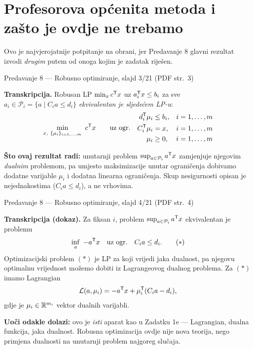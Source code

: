 \section{Profesorova općenita metoda i zašto je ovdje ne trebamo}
\label{sec:z2-dualna-metoda}

Ovo je najvjerojatnije potpitanje na obrani, jer Predavanje 8 glavni rezultat
izvodi \emph{drugim} putem od onoga kojim je zadatak riješen.

\begin{izvor}{Predavanje 8 --- Robusno optimiranje, slajd 3/21 (PDF str.~3)}

\textbf{Transkripcija.} Robusan LP
$\min_x c^{\mathsf{T}} x$ uz $a_i^{\mathsf{T}} x \leq b_i$ za sve
$a_i \in \mathcal{P}_i = \{a \mid C_i a \leq d_i\}$
\emph{ekvivalentan je sljedećem LP-u}:
\[
\min_{x,\ \{\mu_i\}_{i=1,\dots,m}} \ c^{\mathsf{T}} x
\qquad \text{uz ogr.} \quad
\begin{aligned}
d_i^{\mathsf{T}} \mu_i &\leq b_i, & & i = 1,\dots,m \\
C_i^{\mathsf{T}} \mu_i &= x, & & i = 1,\dots,m \\
\mu_i &\geq 0, & & i = 1,\dots,m
\end{aligned}
\]

\textbf{Što ovaj rezultat radi:} unutarnji problem
$\sup_{a \in \mathcal{P}_i} a^{\mathsf{T}} x$ zamjenjuje njegovim \emph{dualnim}
problemom, pa umjesto maksimizacije unutar ograničenja dobivamo dodatne
varijable $\mu_i$ i dodatna linearna ograničenja. Skup nesigurnosti opisan je
nejednakostima ($C_i a \leq d_i$), a ne vrhovima.
\end{izvor}

\begin{izvor}{Predavanje 8 --- Robusno optimiranje, slajd 4/21 (PDF str.~4)}

\textbf{Transkripcija (dokaz).} Za fiksan $i$, problem
$\sup_{a \in \mathcal{P}_i} a^{\mathsf{T}} x$ ekvivalentan je problemu
\[
\inf_a \ -a\trans x \quad \text{uz ogr.} \quad C_i a \leq d_i . \qquad (\ast)
\]
Optimizacijski problem $(\ast)$ je LP za koji vrijedi jaka dualnost, pa njegovu
optimalnu vrijednost možemo dobiti iz Lagrangeovog dualnog problema. Za $(\ast)$
imamo Lagrangian
\[
\mathcal{L}(a, \mu_i) = -a^{\mathsf{T}} x + \mu_i^{\mathsf{T}} (C_i a - d_i),
\]
gdje je $\mu_i \in \mathbb{R}^{m_i}$ vektor dualnih varijabli.

\textbf{Uoči odakle dolazi:} ovo je \emph{isti} aparat kao u Zadatku 1e ---
Lagrangian, dualna funkcija, jaka dualnost. Robusna optimizacija ovdje nije nova
teorija, nego primjena dualnosti na unutarnji problem najgoreg slučaja.
\end{izvor}

